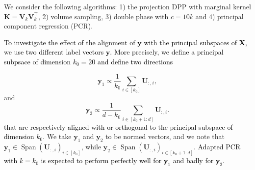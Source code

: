 \documentclass[twoside,11pt]{book}
\newcommand{\rev}[1]{\textcolor{black}{#1}}
\numberwithin{theorem}{chapter}
\numberwithin{definition}{chapter}
\numberwithin{proposition}{chapter}
\numberwithin{corollary}{chapter}
\numberwithin{example}{chapter}
\numberwithin{lemma}{chapter}
\numberwithin{assumption}{chapter}
\numberwithin{equation}{chapter}
\numberwithin{figure}{chapter}
\DeclareMathOperator{\Span}{\mathrm{Span}}
\DeclareMathOperator{\Tran}{\intercal}
\begin{document}
We consider the following algorithms: 1) the projection DPP with marginal kernel $\bm{K}=\bm{V}_{k}^{}\bm{V}_{k}^{\Tran}$, 2) volume sampling, 3) double phase with $c = 10k$ and 4) principal component regression (PCR).

\rev{To investigate the effect of the alignment of $\mathbf{y}$ with the principal subspaces of $\bm{X}$, we use two different label vectors $\mathbf{y}$. More precisely, we define a principal subpsace of dimension $k_0 = 20$ and define two directions}

\begin{equation}
\mathbf{y}_{1} \propto \frac{1}{k_0} \sum\limits_{i \in [k_0]} \bm{U}_{:,i},
\end{equation}
 and
\begin{equation}
\mathbf{y}_{2} \propto \frac{1}{d-k_0} \sum\limits_{i \in [k_0+1:d]} \bm{U}_{:,i}.
\end{equation}
\rev{that are respectively aligned with or orthogonal to the principal subspace of dimension $k_0$.}
We take $\mathbf{y}_{1}$ and $\mathbf{y}_{2}$ to be normed vectors, and we note that $\mathbf{y}_{1} \in \Span (\bm{U}_{:,i})_{i \in [k_0]}$, while $\mathbf{y}_{2} \in \Span (\bm{U}_{:,i})_{i \in [k_0+1:d]}$. \rev{Adapted PCR with $k=k_0$ is expected to perform perfectly well for $\mathbf{y}_{1}$ and badly for $\mathbf{y}_{2}$.}

\end{document}
